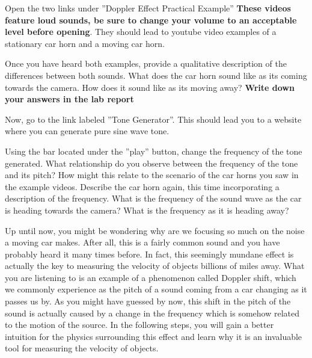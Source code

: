 \begin{steps}
	\item Open the two links under ''Doppler Effect Practical Example'' \textbf{These videos feature loud sounds, be sure to change your volume to an acceptable level before opening}. They should lead to youtube video examples of a stationary car horn and a moving car horn.
	
	\item Once you have heard both examples, provide a qualitative description of the differences between both sounds. What does the car horn sound like as its coming towards the camera. How does it sound like as its moving away? \textbf{Write down your answers in the lab report} %
	
	\item Now, go to the link labeled ''Tone Generator''. This should lead you to a website where you can generate pure sine wave tone. 
	
	\item Using the bar located under the ''play'' button, change the frequency of the tone generated. What relationship do you observe between the frequency of the tone and its pitch? How might this relate to the scenario of the car horns you saw in the example videos. Describe the car horn again, this time incorporating a description of the frequency. What is the frequency of the sound wave as the car is heading towards the camera? What is the frequency as it is heading away? 
	
\end{steps}
	Up until now, you might be wondering  why are we focusing so much on the noise a moving car makes. After all, this is a fairly common sound and you have probably heard it many times before. In fact, this seemingly mundane effect is actually the key to measuring the velocity of objects billions of miles away. What you are listening to is an example of a phenomenon called Doppler shift, which we commonly experience as the pitch of a sound coming from a car changing as it passes us by. As you might have guessed by now, this shift in the pitch of the sound is actually caused by a change in the frequency which is somehow related to the motion of the source. In the following steps, you will gain a better intuition for the physics surrounding this effect and learn why it is an invaluable tool for measuring the velocity of objects.
	
